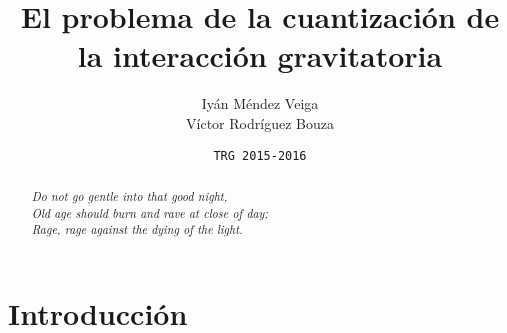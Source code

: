 \documentclass[a4paper,titlepage]{article}
\title{\Huge\textbf{El problema de la cuantización de la interacción gravitatoria}}
\author{\textsf{Iyán Méndez Veiga}\\ \textsf{Víctor Rodríguez Bouza}}
\date{\texttt{TRG 2015-2016}}
\begin{document}
\maketitle

\begin{abstract}\centering\textit{
Do not go gentle into that good night,\\
Old age should burn and rave at close of day;\\
Rage, rage against the dying of the light.}
\end{abstract}

\section{Introducción}






\nocite{*}
\end{document}
